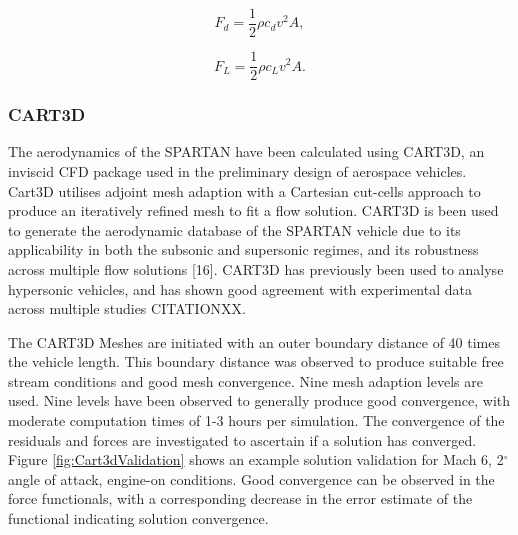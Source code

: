 		\begin{equation}
		F_d = \frac{1}{2}\rho c_d v^2 A ,
		\end{equation}
		
		\begin{equation}
		F_L = \frac{1}{2}\rho c_L v^2 A .
		\end{equation}
		
		
		
		\subsubsection{CART3D}

				The aerodynamics of the SPARTAN have been calculated using CART3D, an inviscid CFD package used in the preliminary design of aerospace vehicles. Cart3D utilises adjoint mesh adaption with a Cartesian cut-cells approach to produce an iteratively refined mesh to fit a flow solution. CART3D is
				been used to generate the aerodynamic database of the SPARTAN vehicle due to its applicability in both the subsonic
				and supersonic regimes, and its robustness across multiple flow solutions [16]. CART3D has previously been used to
				analyse hypersonic vehicles, and has shown good agreement with experimental data across multiple studies CITATIONXX.
				
						The CART3D Meshes are initiated with an outer boundary distance of 40 times the vehicle length. This boundary distance was observed to produce suitable free stream conditions and good mesh convergence. Nine mesh adaption levels are used. Nine levels have been observed to generally produce good convergence, with moderate computation times of 1-3 hours per simulation. The convergence of the residuals and forces are investigated to ascertain if a solution has converged. Figure \ref{fig:Cart3dValidation} shows an example solution validation for Mach 6, 2$^\circ$ angle of attack, engine-on conditions. Good convergence can be observed in the force functionals, with a corresponding decrease in the error estimate of the functional indicating solution convergence.  
						
